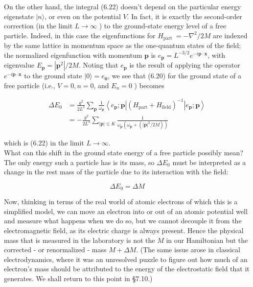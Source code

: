 \documentclass[10pt, letterpaper]{article}
\begin{document}
On the other hand, the integral (6.22) doesn't depend on the particular energy eigenstate $|n\rangle$, or even on the potential $V$. In fact, it is exactly the second-order correction (in the limit $L \rightarrow \infty$ ) to the ground-state energy level of a free particle. Indeed, in this case the eigenfunctions for $H_{\text {part }}=-\nabla^{2} / 2 M$ are indexed by the same lattice in momentum space as the one-quantum states of the field; the normalized eigenfunction with momentum $\mathbf{p}$ is $e_{\mathbf{p}}=L^{-3 / 2} e^{-i \mathbf{p} \cdot \mathbf{x}}$, with eigenvalue $E_{\mathbf{p}}=\left|\mathbf{p}^{2}\right| / 2 M$. Noting that $e_{\mathbf{p}}$ is the result of applying the operator $e^{-i \mathbf{p} \cdot \mathbf{x}}$ to the ground state $|0\rangle=e_{\mathbf{0}}$, we see that (6.20) for the ground state of a free particle (i.e., $V=0, n=0$, and $E_{n}=0$ ) becomes

$$
\begin{aligned}
\Delta E_{0} & =\frac{g^{2}}{2 L^{3}} \sum_{\mathbf{p}} \frac{1}{\omega_{\mathbf{p}}}\left\langle e_{\mathbf{p}} ; \mathbf{p}\right|\left(H_{\mathrm{part}}+H_{\mathrm{field}}\right)^{-1}\left|e_{\mathbf{p}} ; \mathbf{p}\right\rangle \\
& =-\frac{g^{2}}{2 L^{3}} \sum_{|\mathbf{p}| \leq K} \frac{1}{\omega_{\mathbf{p}}\left(\omega_{\mathbf{p}}+\left(|\mathbf{p}|^{2} / 2 M\right)\right)}
\end{aligned}
$$

which is (6.22) in the limit $L \rightarrow \infty$.\\
What can this shift in the ground state energy of a free particle possibly mean? The only energy such a particle has is its mass, so $\Delta E_{0}$ must be interpreted as a change in the rest mass of the particle due to its interaction with the field:

$$
\Delta E_{0}=\Delta M
$$

Now, thinking in terms of the real world of atomic electrons of which this is a simplified model, we can move an electron into or out of an atomic potential well and measure what happens when we do so, but we cannot decouple it from the electromagnetic field, as its electric charge is always present. Hence the physical mass that is measured in the laboratory is not the $M$ in our Hamiltonian but the corrected - or renormalized - mass $M+\Delta M$. (The same issue arose in classical electrodynamics, where it was an unresolved puzzle to figure out how much of an electron's mass should be attributed to the energy of the electrostatic field that it generates. We shall return to this point in §7.10.)
\end{document}
